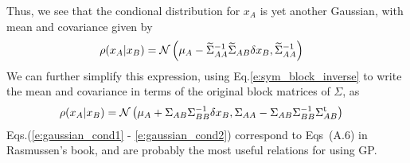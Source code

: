 \documentclass[nobib]{tufte-handout}
\begin{document}
Thus, we see that the condional distribution for $x_A$ is yet another Gaussian, with mean and covariance given by
\begin{align}
  \rho(x_A\lvert x_B) &= \mathcal{N}\left(\mu_A - \widetilde{\Sigma}_{AA}^{-1}\widetilde{\Sigma}_{AB}\delta x_B, \widetilde{\Sigma}_{AA}^{-1}\right)\label{e:gaussian_cond1}
\end{align}
We can further simplify this expression, using Eq.\eqref{e:sym_block_inverse} to write the mean and covariance in terms of the original block matrices of $\Sigma$, as
\begin{align}
  \rho(x_A\lvert x_B) &= \mathcal{N}\left(\mu_A + \Sigma_{AB}\Sigma^{-1}_{BB}\delta x_{B}, \Sigma_{AA} - \Sigma_{AB}\Sigma^{-1}_{BB}\Sigma_{AB}^\textrm{t}\right)\label{e:gaussian_cond2}
\end{align}
Eqs.(\ref{e:gaussian_cond1} - \ref{e:gaussian_cond2}) correspond to Eqs~(A.6) in Rasmussen's book, and are probably the most useful relations for using GP.


\end{document}
